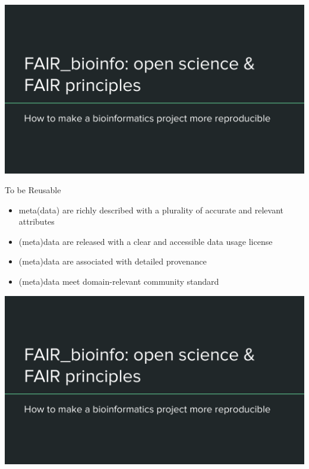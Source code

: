 \begin{frame}
\includegraphics[page=11,scale=0.55]{images/01_OS_and_FAIR_intro.pdf}
\end{frame}

\begin{frame}
\begin{block}{To be Reusable}
\begin{itemize}
\item meta(data) are richly described with a plurality of accurate and relevant attributes
\item (meta)data are released with a clear and accessible data usage license
\item (meta)data are associated with detailed provenance
\item (meta)data meet domain-relevant community standard
\end{itemize}
\end{block}
\end{frame}

\begin{frame}
\includegraphics[page=12,scale=0.6]{images/01_OS_and_FAIR_intro.pdf}
\end{frame}
